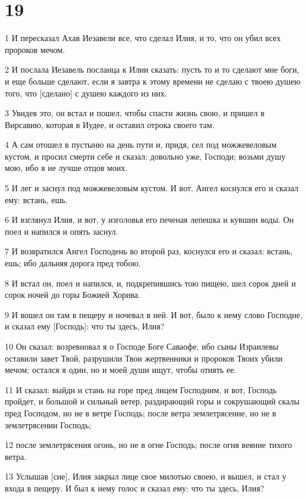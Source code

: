 \chapter{19}

\par 1 И пересказал Ахав Иезавели все, что сделал Илия, и то, что он убил всех пророков мечом.
\par 2 И послала Иезавель посланца к Илии сказать: пусть то и то сделают мне боги, и еще больше сделают, если я завтра к этому времени не сделаю с твоею душею того, что [сделано] с душею каждого из них.
\par 3 Увидев это, он встал и пошел, чтобы спасти жизнь свою, и пришел в Вирсавию, которая в Иудее, и оставил отрока своего там.
\par 4 А сам отошел в пустыню на день пути и, придя, сел под можжевеловым кустом, и просил смерти себе и сказал: довольно уже, Господи; возьми душу мою, ибо я не лучше отцов моих.
\par 5 И лег и заснул под можжевеловым кустом. И вот, Ангел коснулся его и сказал ему: встань, ешь.
\par 6 И взглянул Илия, и вот, у изголовья его печеная лепешка и кувшин воды. Он поел и напился и опять заснул.
\par 7 И возвратился Ангел Господень во второй раз, коснулся его и сказал: встань, ешь; ибо дальняя дорога пред тобою.
\par 8 И встал он, поел и напился, и, подкрепившись тою пищею, шел сорок дней и сорок ночей до горы Божией Хорива.
\par 9 И вошел он там в пещеру и ночевал в ней. И вот, было к нему слово Господне, и сказал ему [Господь]: что ты здесь, Илия?
\par 10 Он сказал: возревновал я о Господе Боге Саваофе, ибо сыны Израилевы оставили завет Твой, разрушили Твои жертвенники и пророков Твоих убили мечом; остался я один, но и моей души ищут, чтобы отнять ее.
\par 11 И сказал: выйди и стань на горе пред лицем Господним, и вот, Господь пройдет, и большой и сильный ветер, раздирающий горы и сокрушающий скалы пред Господом, но не в ветре Господь; после ветра землетрясение, но не в землетрясении Господь;
\par 12 после землетрясения огонь, но не в огне Господь; после огня веяние тихого ветра.
\par 13 Услышав [сие], Илия закрыл лице свое милотью своею, и вышел, и стал у входа в пещеру. И был к нему голос и сказал ему: что ты здесь, Илия?
